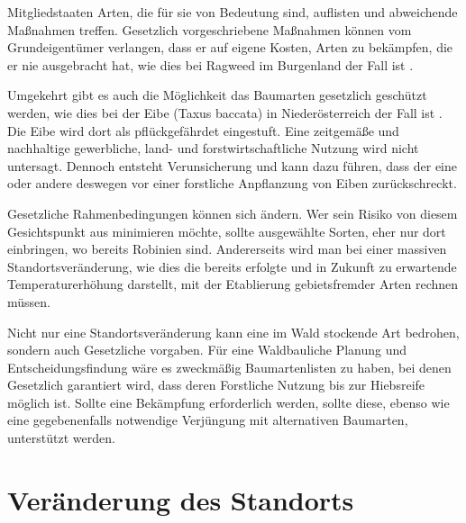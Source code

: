 \documentclass[twocolumn]{scrartcl}
\begin{document}
Mitgliedstaaten Arten, die für sie von Bedeutung sind, auflisten und abweichende
Maßnahmen treffen. Gesetzlich vorgeschriebene Maßnahmen können vom
Grundeigentümer verlangen, dass er auf eigene Kosten, Arten zu bekämpfen, die er
nie ausgebracht hat, wie dies bei Ragweed im Burgenland der Fall ist
\citep{burgenland2021ragweed}.

Umgekehrt gibt es auch die Möglichkeit das Baumarten gesetzlich
geschützt werden, wie dies bei der Eibe (Taxus baccata) in
Niederösterreich der Fall ist
\citep{niederoesterreich2000Naturschutzgesetz,niederoesterreich2005artenschutzverordnung}. Die
Eibe wird dort als pflückgefährdet eingestuft. Eine zeitgemäße und
nachhaltige gewerbliche, land- und forstwirtschaftliche Nutzung wird
nicht untersagt. Dennoch entsteht Verunsicherung und kann dazu
führen, dass der eine oder andere deswegen vor einer forstliche
Anpflanzung von Eiben zurückschreckt.

Gesetzliche Rahmenbedingungen können sich ändern. Wer sein Risiko von diesem Gesichtspunkt aus minimieren
möchte, sollte ausgewählte Sorten, eher nur dort einbringen, wo bereits Robinien sind.
Andererseits wird man bei einer massiven Standortsveränderung, wie dies die bereits erfolgte
und in Zukunft zu erwartende Temperaturerhöhung darstellt, mit der Etablierung gebietsfremder Arten rechnen müssen.

Nicht nur eine Standortsveränderung kann eine im Wald stockende Art
bedrohen, sondern auch Gesetzliche vorgaben. Für eine Waldbauliche
Planung und Entscheidungsfindung wäre es zweckmäßig Baumartenlisten zu
haben, bei denen Gesetzlich garantiert wird, dass deren Forstliche
Nutzung bis zur Hiebsreife möglich ist.
Sollte eine Bekämpfung erforderlich werden, sollte diese, ebenso wie eine
gegebenenfalls notwendige Verjüngung mit alternativen Baumarten, unterstützt werden.

\section{Veränderung des Standorts}
\end{document}
